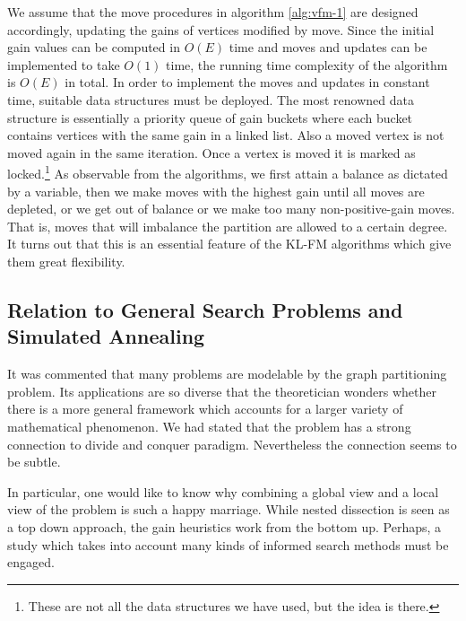 \documentclass[a4paper,12pt]{article}
\begin{document}
We assume that the move procedures in algorithm \ref{alg:vfm-1} are
designed accordingly, updating the gains of vertices modified by move.
Since the initial gain values can be computed in $O(E)$ time and moves
and updates can be implemented to take $O(1)$ time, the running time
complexity of the algorithm is $O(E)$ in total. In order to implement
the moves and updates in constant time, suitable data structures must
be deployed. The most renowned data structure is essentially a
priority queue of gain buckets where each bucket contains vertices
with the same gain in a linked list. Also a moved vertex is not moved
again in the same iteration. Once a vertex is moved it is marked as
locked.\footnote{These are not all the data structures we have used,
but the idea is there.} As observable from the algorithms, we first
attain a balance as dictated by a variable, then we make moves with
the highest gain until all moves are depleted, or we get out of
balance or we make too many non-positive-gain moves. That is, moves
that will imbalance the partition are allowed to a certain degree. It
turns out that this is an essential feature of the KL-FM algorithms
which give them great flexibility.\cite{bend}




\subsection{Relation to General Search Problems and Simulated Annealing}

It was commented that many problems are modelable by the graph
partitioning problem. Its applications are so diverse that the
theoretician wonders whether there is a more general framework which
accounts for a larger variety of mathematical phenomenon. We had
stated that the problem has a strong connection to divide and conquer
paradigm. Nevertheless the connection seems to be subtle.

In particular, one would like to know why combining a global view and
a local view of the problem is such a happy marriage. While nested
dissection is seen as a top down approach, the gain heuristics work from
the bottom up. Perhaps, a study which takes into account many kinds of
informed search methods must be engaged.\cite{aima-search}
\end{document}
